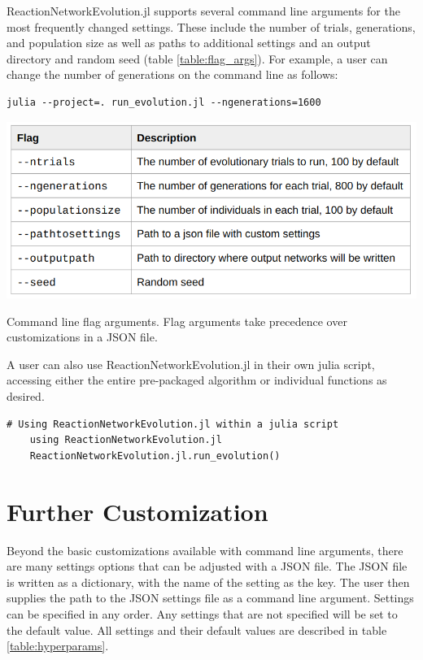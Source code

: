 \documentclass[12pt]{report}
\begin{document}
\begin{appendices}
ReactionNetworkEvolution.jl supports several command line arguments for the most frequently changed settings. These include the number of trials, generations, and population size as well as paths to additional settings and an output directory and random seed (table \ref{table:flag_args}). For example, a user can change the number of generations on the command line as follows:


\begin{Verbatim}[frame=single]
	julia --project=. run_evolution.jl --ngenerations=1600
\end{Verbatim}

\begin{table}
    \centering
    \includegraphics[width=15cm]{images/flag_args_table.png}
    \caption[Description of command line flag arguments]{Command line flag arguments. Flag arguments take precedence over customizations in a JSON file.}
    \label{table:flag_args}
\end{table}

A user can also use ReactionNetworkEvolution.jl in their own julia script, accessing either the entire pre-packaged algorithm or individual functions as desired. 

\begin{Verbatim}[frame=single]
	# Using ReactionNetworkEvolution.jl within a julia script
	using ReactionNetworkEvolution.jl
	ReactionNetworkEvolution.jl.run_evolution()
\end{Verbatim}

\section{Further Customization}
Beyond the basic customizations available with command line arguments, there are many settings options that can be adjusted with a JSON file. The JSON file is written as a dictionary, with the name of the setting as the key. The user then supplies the path to the JSON settings file as a command line argument. Settings can be specified in any order. Any settings that are not specified will be set to the default value. All settings and their default values are described in table \ref{table:hyperparams}.


\end{appendices}
\end{document}
